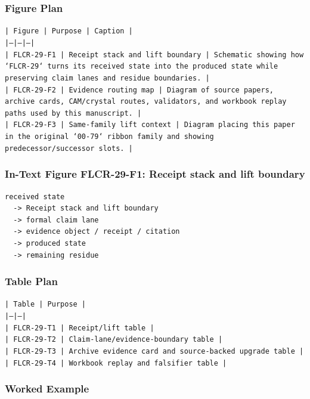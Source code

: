 \documentclass[11pt]{article}
\begin{document}
\subsubsection*{Figure Plan}

\noindent\texttt{| Figure | Purpose | Caption |}\\
\noindent\texttt{|---|---|---|}\\
\noindent\texttt{| FLCR-29-F1 | Receipt stack and lift boundary | Schematic showing how `FLCR-29` turns its received state into the produced state while preserving claim lanes and residue boundaries. |}\\
\noindent\texttt{| FLCR-29-F2 | Evidence routing map | Diagram of source papers, archive cards, CAM/crystal routes, validators, and workbook replay paths used by this manuscript. |}\\
\noindent\texttt{| FLCR-29-F3 | Same-family lift context | Diagram placing this paper in the original `00-79` ribbon family and showing predecessor/successor slots. |}\\

\subsubsection*{In-Text Figure FLCR-29-F1: Receipt stack and lift boundary}

\begin{verbatim}
received state
  -> Receipt stack and lift boundary
  -> formal claim lane
  -> evidence object / receipt / citation
  -> produced state
  -> remaining residue
\end{verbatim}

\subsubsection*{Table Plan}

\noindent\texttt{| Table | Purpose |}\\
\noindent\texttt{|---|---|}\\
\noindent\texttt{| FLCR-29-T1 | Receipt/lift table |}\\
\noindent\texttt{| FLCR-29-T2 | Claim-lane/evidence-boundary table |}\\
\noindent\texttt{| FLCR-29-T3 | Archive evidence card and source-backed upgrade table |}\\
\noindent\texttt{| FLCR-29-T4 | Workbook replay and falsifier table |}\\

\subsubsection*{Worked Example}
\end{document}
